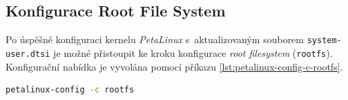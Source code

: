 \documentclass[a4paper, twoside, 11pt]{article}
\newcommand{\fbar}{\FloatBarrier}
\begin{document}
	\fbar
	\subsection{Konfigurace Root File System}
		Po úspěšné konfiguraci kernelu \textit{PetaLinux} s~aktualizovaným souborem \texttt{system-user.dtsi} je možné přistoupit ke kroku konfigurace \textit{root filesystem} (\texttt{rootfs}). Konfigurační nabídka je vyvolána pomocí příkazu \ref{lst:petalinux-config-c-rootfs}.

\begin{lstlisting}[language={sh}, caption={Příkaz pro vyvolání konfigurace root filesystem}, label= {lst:petalinux-config-c-rootfs}, morekeywords={petalinux-build, petalinux-package, petalinux-config}]
petalinux-config -c rootfs\end{lstlisting}
\end{document}
